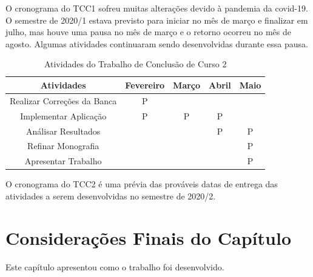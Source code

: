O cronograma do TCC1 sofreu muitas alterações devido à pandemia da covid-19. O semestre de 2020/1 estava previsto para iniciar no mês de março e finalizar em julho, mas houve uma pausa no 
mês de março e o retorno ocorreu no mês de agosto. Algumas atividades continuaram sendo desenvolvidas durante essa pausa.



\begin{table}[h]
	\centering
	\caption{Atividades do Trabalho de Conclusão de Curso 2}
	\label{tab05}
	
	\begin{tabular}{ccccc}
		\toprule
		\textbf{Atividades} & \textbf{Fevereiro} & 
		\textbf{Março}  & \textbf{Abril}& \textbf{Maio}\\
		\midrule
		\begin{minipage} [t] {0.2\textwidth} \centering Realizar Correções da Banca \end{minipage} & P &  &  &  \\
		\midrule
		\begin{minipage} [t] {0.2\textwidth} \centering Implementar Aplicação \end{minipage} & P & P & P &  \\
		\midrule
		\begin{minipage} [t] {0.2\textwidth} \centering Análisar Resultados \end{minipage} &  &  &P &P  \\
		\midrule
		\begin{minipage} [t] {0.2\textwidth} \centering Refinar Monografia \end{minipage} &  &  &  & P \\
		\midrule
		\begin{minipage} [t] {0.2\textwidth} \centering Apresentar Trabalho \end{minipage} &  & & & P \\
		\bottomrule
	\end{tabular}
\end{table}

O cronograma do TCC2 é uma prévia das prováveis datas de entrega das atividades a serem desenvolvidas no semestre de 2020/2.

\section{Considerações Finais do Capítulo}

Este capítulo apresentou como o trabalho foi desenvolvido.

